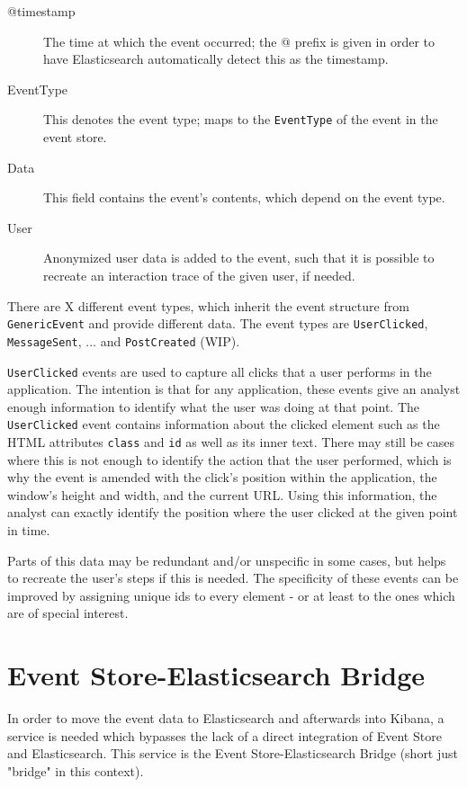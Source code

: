 \begin{description}
\item[@timestamp] The time at which the event occurred; the @ prefix is given in order to have Elasticsearch automatically detect this as the timestamp.
\item[EventType] This denotes the event type; maps to the \texttt{EventType} of the event in the event store.
\item[Data] This field contains the event's contents, which depend on the event type.
\item[User] Anonymized user data is added to the event, such that it is possible to recreate an interaction trace of the given user, if needed.
\end{description}

There are X different event types, which inherit the event structure from \texttt{GenericEvent} and provide different data.
The event types are \texttt{UserClicked}, \texttt{MessageSent}, ... and \texttt{PostCreated} (WIP).

\texttt{UserClicked} events are used to capture all clicks that a user performs in the application.
The intention is that for any application, these events give an analyst enough information to identify what the user was doing at that point.
The \texttt{UserClicked} event contains information about the clicked element such as the HTML attributes \texttt{class} and \texttt{id} as well as its inner text.
There may still be cases where this is not enough to identify the action that the user performed, which is why the event is amended with the click's position within the application, the window's height and width, and the current URL.
Using this information, the analyst can exactly identify the position where the user clicked at the given point in time.

Parts of this data may be redundant and/or unspecific in some cases, but helps to recreate the user's steps if this is needed.
The specificity of these events can be improved by assigning unique ids to every element - or at least to the ones which are of special interest.

\section{Event Store-Elasticsearch Bridge}
\label{sec:design:bridge}

In order to move the event data to Elasticsearch and afterwards into Kibana, a service is needed which bypasses the lack of a direct integration of Event Store and Elasticsearch.
This service is the Event Store-Elasticsearch Bridge (short just "bridge" in this context).


